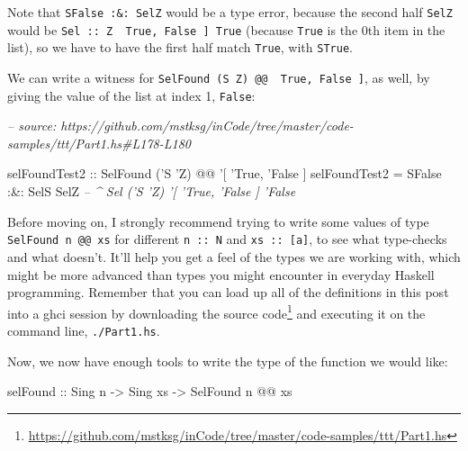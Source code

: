 \documentclass[]{article}
\newenvironment{Shaded}{}{}
\newcommand{\CommentTok}[1]{\textcolor[rgb]{0.38,0.63,0.69}{\textit{#1}}}
\newcommand{\DataTypeTok}[1]{\textcolor[rgb]{0.56,0.13,0.00}{#1}}
\newcommand{\FunctionTok}[1]{\textcolor[rgb]{0.02,0.16,0.49}{#1}}
\newcommand{\NormalTok}[1]{#1}
\newcommand{\OtherTok}[1]{\textcolor[rgb]{0.00,0.44,0.13}{#1}}
\renewcommand{\href}[2]{#2\footnote{\url{#1}}}
\begin{document}
Note that \texttt{SFalse\ :\&:\ SelZ} would be a type error, because the second
half \texttt{SelZ} would be
\texttt{Sel\ ::\ \textquotesingle{}Z\ \textquotesingle{}{[}\ \textquotesingle{}True,\ \textquotesingle{}False\ {]}\ \textquotesingle{}True}
(because \texttt{\textquotesingle{}True} is the 0th item in the list), so we
have to have the first half match \texttt{\textquotesingle{}True}, with
\texttt{STrue}.

We can write a witness for
\texttt{SelFound\ (\textquotesingle{}S\ \textquotesingle{}Z)\ @@\ \textquotesingle{}{[}\ \textquotesingle{}True,\ \textquotesingle{}False\ {]}},
as well, by giving the value of the list at index 1,
\texttt{\textquotesingle{}False}:

\begin{Shaded}
\begin{Highlighting}[]
\CommentTok{-- source: https://github.com/mstksg/inCode/tree/master/code-samples/ttt/Part1.hs#L178-L180}

\OtherTok{selFoundTest2 ::} \DataTypeTok{SelFound}\NormalTok{ ('}\DataTypeTok{S}\NormalTok{ '}\DataTypeTok{Z}\NormalTok{) }\FunctionTok{@@}\NormalTok{ '[ '}\DataTypeTok{True}\NormalTok{, '}\DataTypeTok{False}\NormalTok{ ]}
\NormalTok{selFoundTest2 }\FunctionTok{=} \DataTypeTok{SFalse} \FunctionTok{:&:} \DataTypeTok{SelS} \DataTypeTok{SelZ}
                        \CommentTok{-- ^ Sel ('S 'Z) '[ 'True, 'False ] 'False}
\end{Highlighting}
\end{Shaded}

Before moving on, I strongly recommend trying to write some values of type
\texttt{SelFound\ n\ @@\ xs} for different \texttt{n\ ::\ N} and
\texttt{xs\ ::\ {[}a{]}}, to see what type-checks and what doesn't. It'll help
you get a feel of the types we are working with, which might be more advanced
than types you might encounter in everyday Haskell programming. Remember that
you can load up all of the definitions in this post into a ghci session by
downloading
\href{https://github.com/mstksg/inCode/tree/master/code-samples/ttt/Part1.hs}{the
source code} and executing it on the command line, \texttt{./Part1.hs}.

Now, we now have enough tools to write the type of the function we would like:

\begin{Shaded}
\begin{Highlighting}[]
\NormalTok{selFound}
\OtherTok{    ::} \DataTypeTok{Sing}\NormalTok{ n}
    \OtherTok{->} \DataTypeTok{Sing}\NormalTok{ xs}
    \OtherTok{->} \DataTypeTok{SelFound}\NormalTok{ n }\FunctionTok{@@}\NormalTok{ xs}
\end{Highlighting}
\end{Shaded}
\end{document}
